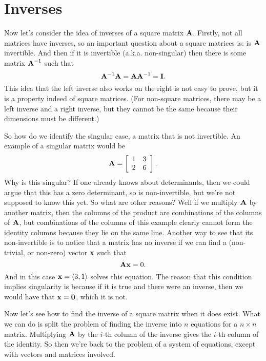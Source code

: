 \section{Inverses}

Now let's consider the idea of inverses of a square matrix $\boldsymbol{\mathbf{A}}$. Firstly, not all matrices have inverses, so an important question about a square matrices is: is $\boldsymbol{\mathbf{A}}$ invertible. And then if it is invertible (a.k.a. non-singular) then there is some matrix $\boldsymbol{\mathbf{A}}^{-1}$ such that
\[ \boldsymbol{\mathbf{A}}^{-1}\boldsymbol{\mathbf{A}} = \boldsymbol{\mathbf{A}}\boldsymbol{\mathbf{A}}^{-1} = \boldsymbol{\mathbf{I}}. \]
This idea that the left inverse also works on the right is not easy to prove, but it is a property indeed of square matrices. (For non-square matrices, there may be a left inverse and a right inverse, but they cannot be the same because their dimensions must be different.)

So how do we identify the singular case, a matrix that is not invertible. 
\bex
An example of a singular matrix would be
\[ \boldsymbol{\mathbf{A}} = \left[ \begin{array}{rrrrrrrrrrrrrrrrrrrrrrrrr} 1&3\\2&6\\ \end{array} \right]. \]
Why is this singular? If one already knows about determinants, then we could argue that this has a zero determinant, so is non-invertible, but we're not supposed to know this yet. So what are other reasons? Well if we multiply $\boldsymbol{\mathbf{A}}$ by another matrix, then the columns of the product are combinations of the columns of $\boldsymbol{\mathbf{A}}$, but combinations of the columns of this example clearly cannot form the identity columns because they lie on the same line. Another way to see that its non-invertible is to notice that a matrix has no inverse if we can find a (non-trivial, or non-zero) vector $\boldsymbol{\mathbf{x}}$ such that 
\[ \boldsymbol{\mathbf{A}}\boldsymbol{\mathbf{x}} = 0. \]
And in this case $\boldsymbol{\mathbf{x}} = \langle 3,1 \rangle$ solves this equation. The reason that this condition implies singularity is because if it is true and there were an inverse, then we would have that $\boldsymbol{\mathbf{x}} = \boldsymbol{\mathbf{0}}$, which it is not. 
\eex

Now let's see how to find the inverse of a square matrix when it does exist.
What we can do is split the problem of finding the inverse into $n$ equations for a $n \times n$ matrix. Multiplying $\boldsymbol{\mathbf{A}}$ by the $i$-th column of the inverse gives the $i$-th column of the identity. So then we're back to the problem of a system of equations, except with vectors and matrices involved.

